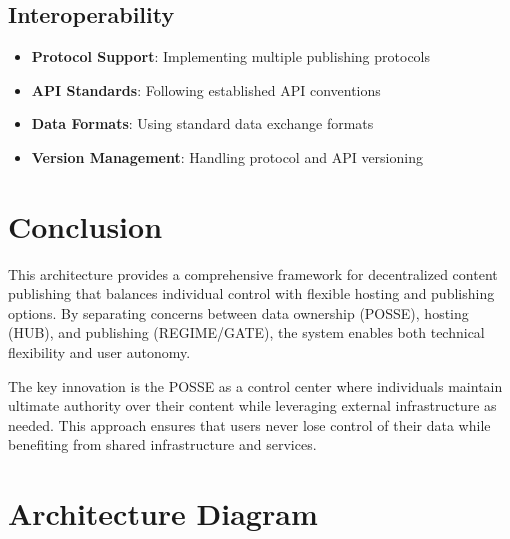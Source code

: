 \documentclass[11pt]{article}
\begin{document}
\subsection{Interoperability}

\begin{itemize}
    \item \textbf{Protocol Support}: Implementing multiple publishing protocols
    \item \textbf{API Standards}: Following established API conventions
    \item \textbf{Data Formats}: Using standard data exchange formats
    \item \textbf{Version Management}: Handling protocol and API versioning
\end{itemize}

\section{Conclusion}

This architecture provides a comprehensive framework for decentralized content publishing that balances individual control with flexible hosting and publishing options. By separating concerns between data ownership (POSSE), hosting (HUB), and publishing (REGIME/GATE), the system enables both technical flexibility and user autonomy.

The key innovation is the POSSE as a control center where individuals maintain ultimate authority over their content while leveraging external infrastructure as needed. This approach ensures that users never lose control of their data while benefiting from shared infrastructure and services.

\section{Architecture Diagram}
\end{document}
